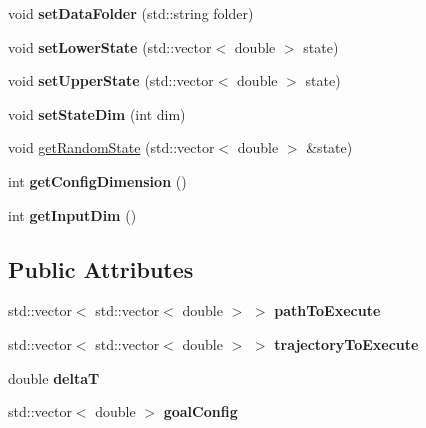 \begin{DoxyCompactItemize}
\item 
void {\bfseries set\+Data\+Folder} (std\+::string folder)\hypertarget{classvpRobot_a609cf4359072547554a7c8ff917c5a81}{}\label{classvpRobot_a609cf4359072547554a7c8ff917c5a81}

\item 
void {\bfseries set\+Lower\+State} (std\+::vector$<$ double $>$ state)\hypertarget{classvpRobot_a6495dc7d18d05f226069adf701c03b04}{}\label{classvpRobot_a6495dc7d18d05f226069adf701c03b04}

\item 
void {\bfseries set\+Upper\+State} (std\+::vector$<$ double $>$ state)\hypertarget{classvpRobot_aad26e13564425cd0d128a68d64a84c86}{}\label{classvpRobot_aad26e13564425cd0d128a68d64a84c86}

\item 
void {\bfseries set\+State\+Dim} (int dim)\hypertarget{classvpRobot_a7e00328adf33c213c0a01f2389da1642}{}\label{classvpRobot_a7e00328adf33c213c0a01f2389da1642}

\item 
void \hyperlink{classvpRobot_ae7c97559dac8703c06ec1c8ac75e0878}{get\+Random\+State} (std\+::vector$<$ double $>$ \&state)
\item 
int {\bfseries get\+Config\+Dimension} ()\hypertarget{classvpRobot_a651ceba7e7ac6173688170aa59318806}{}\label{classvpRobot_a651ceba7e7ac6173688170aa59318806}

\item 
int {\bfseries get\+Input\+Dim} ()\hypertarget{classvpRobot_a76e2b6096960dab7bb0dfa9611f621ca}{}\label{classvpRobot_a76e2b6096960dab7bb0dfa9611f621ca}

\end{DoxyCompactItemize}
\subsection*{Public Attributes}
\begin{DoxyCompactItemize}
\item 
std\+::vector$<$ std\+::vector$<$ double $>$ $>$ {\bfseries path\+To\+Execute}\hypertarget{classvpRobot_a62ccc768092b809ae62f2c1a5de3ce77}{}\label{classvpRobot_a62ccc768092b809ae62f2c1a5de3ce77}

\item 
std\+::vector$<$ std\+::vector$<$ double $>$ $>$ {\bfseries trajectory\+To\+Execute}\hypertarget{classvpRobot_ab01511035608dbae618b331627bb62a6}{}\label{classvpRobot_ab01511035608dbae618b331627bb62a6}

\item 
double {\bfseries deltaT}\hypertarget{classvpRobot_a176bd0871646d32657a719d18ad36d50}{}\label{classvpRobot_a176bd0871646d32657a719d18ad36d50}

\item 
std\+::vector$<$ double $>$ {\bfseries goal\+Config}\hypertarget{classvpRobot_a8daac27773e2babc44d295a9f2aa5d81}{}\label{classvpRobot_a8daac27773e2babc44d295a9f2aa5d81}

\end{DoxyCompactItemize}
